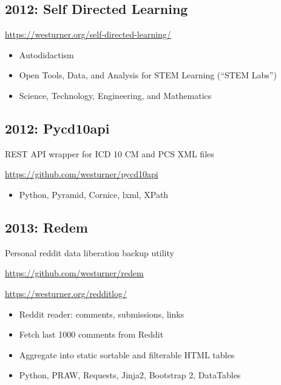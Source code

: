 \documentclass[letter,,openany,oneside]{sphinxhowto}
\begin{document}
\subsection{2012: Self Directed Learning}
\label{resume:self-directed-learning}
\begin{DUlineblock}{0em}
\item[] \href{https://westurner.org/self-directed-learning/}{https://westurner.org/self-directed-learning/}
\end{DUlineblock}
\begin{itemize}
\item {} 
Autodidactism

\item {} 
Open Tools, Data, and Analysis for STEM Learning (``STEM Labs'')

\item {} 
Science, Technology, Engineering, and Mathematics

\end{itemize}


\subsection{2012: Pycd10api}
\label{resume:pycd10api}
\begin{DUlineblock}{0em}
\item[] REST API wrapper for ICD 10 CM and PCS XML files
\item[] \href{https://github.com/westurner/pycd10api}{https://github.com/westurner/pycd10api}
\end{DUlineblock}
\begin{itemize}
\item {} 
Python, Pyramid, Cornice, lxml, XPath

\end{itemize}


\subsection{2013: Redem}
\label{resume:redem}
\begin{DUlineblock}{0em}
\item[] Personal reddit data liberation backup utility
\item[] \href{https://github.com/westurner/redem}{https://github.com/westurner/redem}
\item[] \href{https://westurner.org/redditlog/}{https://westurner.org/redditlog/}
\end{DUlineblock}
\begin{itemize}
\item {} 
Reddit reader: comments, submissions, links

\item {} 
Fetch last 1000 comments from Reddit

\item {} 
Aggregate into static sortable and filterable HTML tables

\item {} 
Python, PRAW, Requests, Jinja2, Bootstrap 2, DataTables

\end{itemize}
\end{document}
